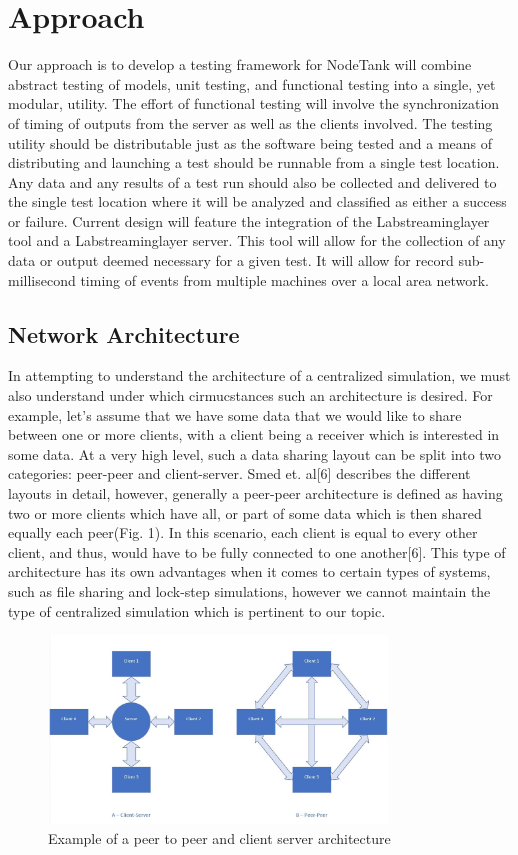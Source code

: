 \documentclass[conference]{IEEEtran}
\begin{document}
\section{Approach}
Our approach is to develop a testing framework for NodeTank will combine abstract testing of models, unit testing, and functional testing into a single, yet modular,
utility. The effort of functional testing will involve the synchronization of timing of outputs from the server as well as the clients involved. The testing utility
should be distributable just as the software being tested and a means of distributing and launching a test should be runnable from a single test location. Any data and
any results of a test run should also be collected and delivered to the single test location where it will be analyzed and classified as either a success or failure.
Current design will feature the integration of the Labstreaminglayer tool and a Labstreaminglayer server. This tool will allow for the collection of any data or output
deemed necessary for a given test. It will allow for record sub-millisecond timing of events from multiple machines over a local area network.

\subsection{Network Architecture}

In attempting to understand the architecture of a centralized simulation, we must also understand under which cirmucstances such an architecture is desired. For example,
let's assume that we have some data that we would like to share between one or more clients, with a client being a receiver which is interested in some data. At a very high level, such
a data sharing layout can be split into two categories: peer-peer and client-server. Smed et. al[6] describes the different layouts in detail, however, generally a peer-peer architecture
is defined as having two or more clients which have all, or part of some data which is then shared equally each peer(Fig. 1). In this scenario, each client is equal to every other client, and thus,
would have to be fully connected to one another[6]. This type of architecture has its own advantages when it comes to certain types of systems, such as file sharing and lock-step simulations,
however we cannot maintain the type of centralized simulation which is pertinent to our topic.

\begin{figure}[htbp]
\centerline{\includegraphics [width = 9cm, height = 5cm] {NetworkArchitecture.jpg}}
\caption{Example of a peer to peer and client server architecture}
\end{figure}
\end{document}
